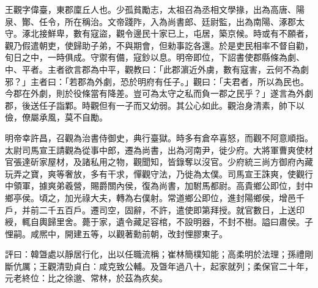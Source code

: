 
\begin{pinyinscope}
王觀字偉臺，東郡廩丘人也。少孤貧勵志，太祖召為丞相文學掾，出為高唐、陽泉、酇、任令，所在稱治。文帝踐阼，入為尚書郎、廷尉監，出為南陽、涿郡太守。涿北接鮮卑，數有寇盜，觀令邊民十家已上，屯居，築京候。時或有不願者，觀乃假遣朝吏，使歸助子弟，不與期會，但勑事訖各還。於是吏民相率不督自勸，旬日之中，一時俱成。守禦有備，寇鈔以息。明帝即位，下詔書使郡縣條為劇、中、平者。主者欲言郡為中平，觀教曰：「此郡濵近外虜，數有寇害，云何不為劇邪？」主者曰：「若郡為外劇，恐於明府有任子。」觀曰：「夫君者，所以為民也。今郡在外劇，則於役條當有降差。豈可為太守之私而負一郡之民乎？」遂言為外劇郡，後送任子詣鄴。時觀但有一子而又幼弱。其公心如此。觀治身清素，帥下以儉，僚屬承風，莫不自勵。

明帝幸許昌，召觀為治書侍御史，典行臺獄。時多有倉卒喜怒，而觀不阿意順指。太尉司馬宣王請觀為從事中郎，遷為尚書，出為河南尹，徙少府。大將軍曹爽使材官張達斫家屋材，及諸私用之物，觀聞知，皆錄奪以沒官。少府統三尚方御府內藏玩弄之寶，爽等奢放，多有干求，憚觀守法，乃徙為太僕。司馬宣王誅爽，使觀行中領軍，據爽弟羲營，賜爵關內侯，復為尚書，加駙馬都尉。高貴鄉公即位，封中鄉亭侯。頃之，加光祿大夫，轉為右僕射。常道鄉公即位，進封陽鄉侯，增邑千戶，并前二千五百戶。遷司空，固辭，不許，遣使即第拜授。就官數日，上送印綬，輒自輿歸里舍。薨于家，遺令藏足容棺，不設明器，不封不樹。謚曰肅侯。子悝嗣。咸熈中，開建五等，以觀著勳前朝，改封悝膠東子。

評曰：韓曁處以靜居行化，出以任職流稱；崔林簡樸知能；高柔明於法理；孫禮剛斷伉厲；王觀清勁貞白：咸克致公輔。及曁年過八十，起家就列；柔保官二十年，元老終位：比之徐邈、常林，於茲為疚矣。


\end{pinyinscope}